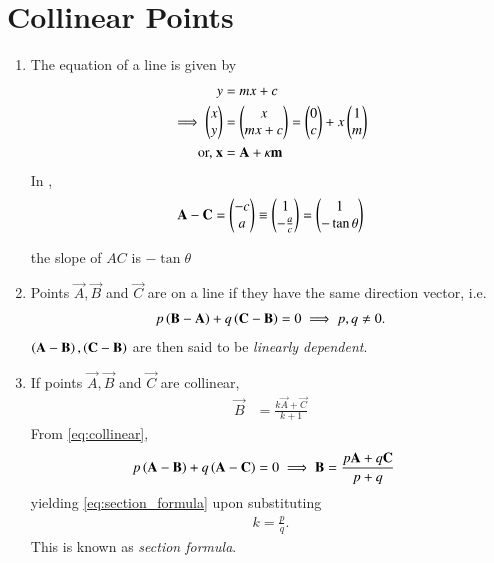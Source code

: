 \section{Collinear Points}
\begin{enumerate}[label=\thesection.\arabic*.,ref=\thesection.\theenumi]
\item The equation of a line is given by 
\begin{align}
	y &= mx + c
	\\
	\implies \begin{pmatrix}x \\ y\end{pmatrix} &= \begin{pmatrix}x \\ 
	 mx + c\end{pmatrix} =\begin{pmatrix}0 \\ c\end{pmatrix} + x\begin{pmatrix}1 \\ m\end{pmatrix}
	 \\
	 \text{or, }\mathbf{x} &= \mathbf{A}+\kappa\mathbf{m}
\end{align}
	In 
, 
\begin{align}
\mathbf{A}-\mathbf{C}
	=  \begin{pmatrix}-c \\ a\end{pmatrix} \equiv \begin{pmatrix}1 \\ -\frac{a}{c}\end{pmatrix} = \begin{pmatrix}1 \\ -\tan \theta\end{pmatrix}
\end{align}

		the slope of $AC$ is $-\tan \theta$
  \item Points $\vec{A},\vec{B}$ and $\vec{C}$ are on a line  if they have the same direction vector, i.e.
\begin{align}
	  \label{eq:collinear}
	p\left(\mathbf{B}-\mathbf{A}\right)
	+ q\left(\mathbf{C}-\mathbf{B}\right) = 0
	\implies p, q \ne 0.
\end{align}
	$\left(\mathbf{A}-\mathbf{B}\right),
	 \left(\mathbf{C}-\mathbf{B}\right)$
		are then said to be {\em linearly dependent}.
		\item If points $\vec{A}, \vec{B}$ and $\vec{C}$ are collinear, 
  \begin{align}
	  \vec{B}&= \frac{k\vec{A}+ \vec{C}}{k+1}
  \end{align}
  \solution From  
	  \eqref{eq:collinear},
	\begin{align}
	p\left(\mathbf{A}-\mathbf{B}\right)
		+ q\left(\mathbf{A}-\mathbf{C}\right) &= 0
		\implies \mathbf{B} = \frac{p\mathbf{A}+q\mathbf{C}}{p+q}
\end{align}
yielding 
	  \eqref{eq:section_formula}
	  upon substituting
\begin{align}
	k = \frac{p}{q}.
\end{align}
		This is known as {\em section formula}.


\end{enumerate}
